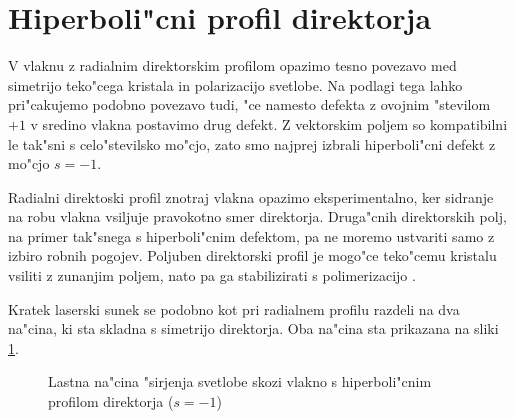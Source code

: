 \documentclass[12pt,twoside,openright,final]{report}
\begin{document}
\section{Hiperboli"cni profil direktorja}

V vlaknu z radialnim direktorskim profilom opazimo tesno povezavo med simetrijo teko"cega kristala in polarizacijo svetlobe. 
Na podlagi tega lahko pri"cakujemo podobno povezavo tudi, "ce namesto defekta z ovojnim "stevilom $+1$ v sredino vlakna postavimo drug defekt. 
Z vektorskim poljem so kompatibilni le tak"sni s celo"stevilsko mo"cjo, zato smo najprej izbrali hiperboli"cni defekt z mo"cjo $s=-1$. 

Radialni direktoski profil znotraj vlakna opazimo eksperimentalno, ker sidranje na robu vlakna vsiljuje pravokotno smer direktorja. 
Druga"cnih direktorskih polj, na primer tak"snega s hiperboli"cnim defektom, pa ne moremo ustvariti samo z izbiro robnih pogojev. 
Poljuben direktorski profil je mogo"ce teko"cemu kristalu vsiliti z zunanjim poljem, nato pa ga stabilizirati s polimerizacijo \cite{dierking-polymer}. 

Kratek laserski sunek se podobno kot pri radialnem profilu razdeli na dva na"cina, ki sta skladna s simetrijo direktorja. 
Oba na"cina sta prikazana na sliki \ref{fig:pulse-m1-mode}. 

\begin{figure}[!htbp]
 \centering
 \caption{Lastna na"cina "sirjenja svetlobe skozi vlakno s hiperboli"cnim profilom direktorja ($s=-1$)}
 \label{fig:pulse-m1-mode}
\end{figure}
\end{document}
